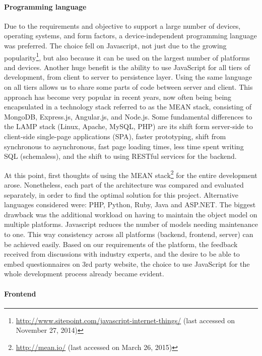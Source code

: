 	\paragraph{Programming language}

		Due to the requirements and objective to support a large number of devices, operating systems, and form factors, a device-independent programming language was preferred. 
		The choice fell on Javascript, not just due to the growing popularity\footnote{\url{http://www.sitepoint.com/javascript-internet-things/} (last accessed on November 27, 2014)}, but also because it can be used on the largest number of platforms and devices. Another huge benefit is the ability to use JavaScript for all tiers of development, from client to server to persistence layer. Using the same language on all tiers allows us to share some parts of code between server and client. This approach has become very popular in recent years, now often being being encapsulated in a technology stack referred to as the MEAN stack, consisting of MongoDB, Express.js, Angular.js, and Node.js. Some fundamental differences to the LAMP stack (Linux, Apache, MySQL, PHP) are its shift form server-side to client-side single-page applications (SPA), faster prototyping, shift from synchronous to asynchronous, fast page loading times, less time spent writing SQL (schemaless), and the shift to using RESTful services for the backend. \cite{Scott2014MEANStack}

		At this point, first thoughts of using the MEAN stack\footnote{\url{http://mean.io/} (last accessed on March 26, 2015)} for the entire development arose. Nonetheless, each part of the architecture was compared and evaluated separately, in order to find the optimal solution for this project. Alternative languages considered were: PHP, Python, Ruby, Java and ASP.NET. The biggest drawback was the additional workload on having to maintain the object model on multiple platforms. Javascript reduces the number of models needing maintenance to one. This way consistency across all platforms (backend, frontend, server) can be achieved easily.
		Based on our requirements of the platform, the feedback received from discussions with industry experts, and the desire to be able to embed questionnaires on 3rd party website, the choice to use JavaScript for the whole development process already became evident. 


	\paragraph{Frontend}

